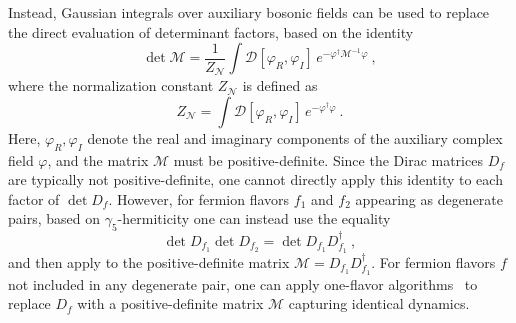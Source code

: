 \documentclass[aps,prd,twocolumn,nofootinbib,superscriptaddress,preprintnumbers]{revtex4-1}
\begin{document}
Instead, Gaussian integrals over auxiliary bosonic fields can be used to replace the direct evaluation of determinant factors, based on the identity
%
\begin{equation}\label{eq:pf-determinant}
    \det \mathcal{M} = \frac{1}{Z_{\mathcal{N}}} \int \mathcal{D}[\varphi_R,\varphi_I] \, e^{-\varphi^\dagger \mathcal{M}^{-1} \varphi}\ ,
\end{equation}
%
where the normalization constant $Z_\mathcal{N}$ is defined as
%
\begin{equation}\label{eq:gauss-normalization}
    Z_{\mathcal{N}} = \int \mathcal{D}[\varphi_R,\varphi_I] \, e^{-\varphi^\dagger \varphi}\ .
\end{equation}
%
Here, $\varphi_R,\varphi_I$ denote the real and imaginary components of the auxiliary complex field $\varphi$, and the matrix $\mathcal{M}$ must be positive-definite. Since the Dirac matrices $D_f$ are typically not positive-definite, one cannot directly apply this identity to each factor of $\det{D_f}$. However, for fermion flavors $f_1$ and $f_2$ appearing as degenerate pairs, based on $\gamma_5$-hermiticity one can instead use the equality
%
\begin{equation}
    \det{D_{f_1}} \det{D_{f_2}} = \det{D_{f_1} D_{f_1}^\dagger}\ ,
\end{equation}
%
and then apply  to the positive-definite matrix ${\mathcal{M} = D_{f_1} D_{f_1}^\dagger}$. For fermion flavors $f$ not included in any degenerate pair, one can apply one-flavor algorithms~\cite{Kennedy:1998cu,Ogawa:2009ex,Chen:2014hyy} to replace $D_f$ with a positive-definite matrix $\mathcal{M}$ capturing identical dynamics.
\end{document}
